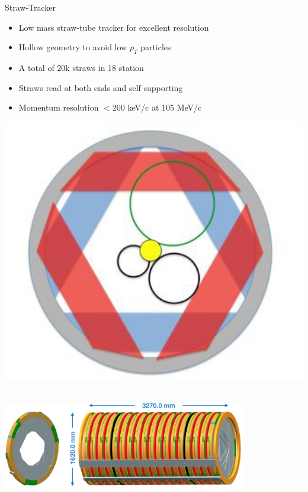\documentclass[10pt]{beamer}
\begin{document}
%
\begin{frame}{Straw-Tracker}
\begin{minipage}{.7\textwidth}
\begin{itemize}
\setlength\itemsep{0.3cm}
\item Low mass straw-tube tracker for excellent resolution
\item Hollow geometry to avoid low $p_T$ particles
\item A total of 20k straws in 18 station
\item Straws read at both ends and self supporting
\item Momentum resolution $<200$ keV/c at 105 MeV/c
\end{itemize}
\end{minipage}
\begin{minipage}{0.29\textwidth}
\centering
\includegraphics[width=1\textwidth]{mu2e_tracker_front}
\end{minipage}\\
\vspace{0.4cm}
\centering
\includegraphics[width=0.8\textwidth]{Tracker_2}
\end{frame}
\end{document}
